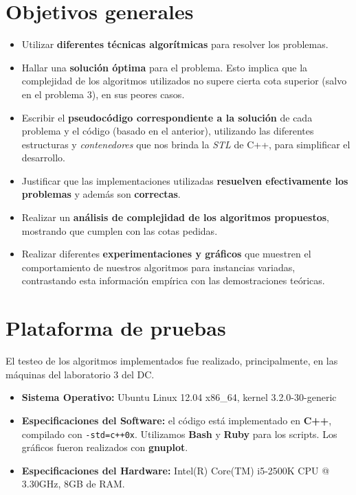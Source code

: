 \documentclass[a4paper]{article}
\begin{document}
\section{Objetivos generales}
\begin{itemize}
  \item Utilizar \textbf{diferentes técnicas algorítmicas} para resolver los problemas.
  
  \item Hallar una \textbf{solución óptima} para el problema. Esto implica que la complejidad de los 
  algoritmos utilizados no supere cierta cota superior (salvo en el problema 3), en sus peores casos.  
  
  \item Escribir el \textbf{pseudocódigo correspondiente a la solución} de cada problema y el código
  (basado en el anterior), utilizando las diferentes estructuras y \textit{contenedores} que nos 
  brinda la \textit{STL} de C++, para simplificar el desarrollo.
  
  \item Justificar que las implementaciones utilizadas \textbf{resuelven efectivamente los problemas} y
  además son \textbf{correctas}.
  
  \item Realizar un \textbf{análisis de complejidad de los algoritmos propuestos}, mostrando que cumplen
  con las cotas pedidas.
  
  \item Realizar diferentes \textbf{experimentaciones y gráficos} que muestren el comportamiento de nuestros
  algoritmos para instancias variadas, contrastando esta información empírica con las demostraciones
  teóricas.
\end{itemize}

\newpage

\section{Plataforma de pruebas}
El testeo de los algoritmos implementados fue realizado, principalmente, en las máquinas del laboratorio 3 del DC. \newline
\begin{itemize}
  \item \textbf{Sistema Operativo:} Ubuntu Linux 12.04 x86_64, kernel 3.2.0-30-generic
  
  \item \textbf{Especificaciones del Software:} el código está implementado en \textbf{C++}, compilado con \verb|-std=c++0x|. 
  Utilizamos \textbf{Bash} y \textbf{Ruby} para los scripts. Los gráficos fueron realizados con \textbf{gnuplot}.
  
  \item \textbf{Especificaciones del Hardware:} Intel(R) Core(TM) i5-2500K CPU @ 3.30GHz, 8GB de RAM.
\end{itemize}
\end{document}
